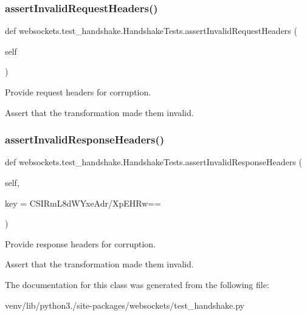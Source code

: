 \subsubsection{\texorpdfstring{assert\+Invalid\+Request\+Headers()}{assertInvalidRequestHeaders()}}
{\footnotesize\ttfamily def websockets.\+test\+\_\+handshake.\+Handshake\+Tests.\+assert\+Invalid\+Request\+Headers (\begin{DoxyParamCaption}\item[{}]{self }\end{DoxyParamCaption})}

\begin{DoxyVerb}Provide request headers for corruption.

Assert that the transformation made them invalid.\end{DoxyVerb}
 \mbox{\label{classwebsockets_1_1test__handshake_1_1_handshake_tests_afad82c0cd59e503d9cd6f3ab947e6d27}} 
\subsubsection{\texorpdfstring{assert\+Invalid\+Response\+Headers()}{assertInvalidResponseHeaders()}}
{\footnotesize\ttfamily def websockets.\+test\+\_\+handshake.\+Handshake\+Tests.\+assert\+Invalid\+Response\+Headers (\begin{DoxyParamCaption}\item[{}]{self,  }\item[{}]{key = {\ttfamily \textquotesingle{}CSIRmL8dWYxeAdr/XpEHRw==\textquotesingle{}} }\end{DoxyParamCaption})}

\begin{DoxyVerb}Provide response headers for corruption.

Assert that the transformation made them invalid.\end{DoxyVerb}
 

The documentation for this class was generated from the following file\+:\begin{DoxyCompactItemize}
\item 
venv/lib/python3./site-\/packages/websockets/test\+\_\+handshake.\+py\end{DoxyCompactItemize}
